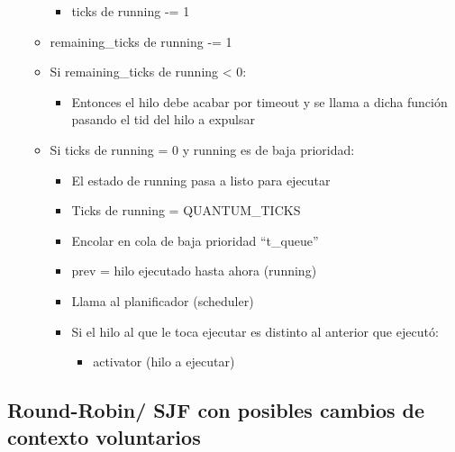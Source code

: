 \documentclass[10pt, spanish, pdftex]{template/UC3M_document}
\begin{document}
\begin{itemize}
\begin{itemize}
        \vspace{-2mm}
    \begin{itemize}
     \setlength{\itemsep}{-1.5mm}
            \item ticks de running -= 1
        \end{itemize}
        \item remaining\_ticks de running -= 1
        \item Si remaining\_ticks de running < 0:
       \vspace{-2mm}
    \begin{itemize}
     \setlength{\itemsep}{-1.5mm}
            \item Entonces el hilo debe acabar por timeout y se llama a dicha función pasando el tid del hilo a expulsar
        \end{itemize}
        \item Si ticks de running = 0 y running es de baja prioridad:
        \vspace{-2mm}
    \begin{itemize}
     \setlength{\itemsep}{-1.5mm}
            \item El estado de running pasa a listo para ejecutar
            \item Ticks de running = QUANTUM\_TICKS
            \item Encolar en cola de baja prioridad “t\_queue”
            \item prev = hilo ejecutado hasta ahora (running)
            \item Llama al planificador (scheduler)
            \item Si el hilo al que le toca ejecutar es distinto al anterior que ejecutó:
            \vspace{-2mm}
    \begin{itemize}
     \setlength{\itemsep}{-1.5mm}
                \item activator (hilo a ejecutar)
            \end{itemize}
        \end{itemize}
    \end{itemize}
\end{itemize}



\subsection{Round-Robin/ SJF con posibles cambios de contexto voluntarios}
\end{document}
